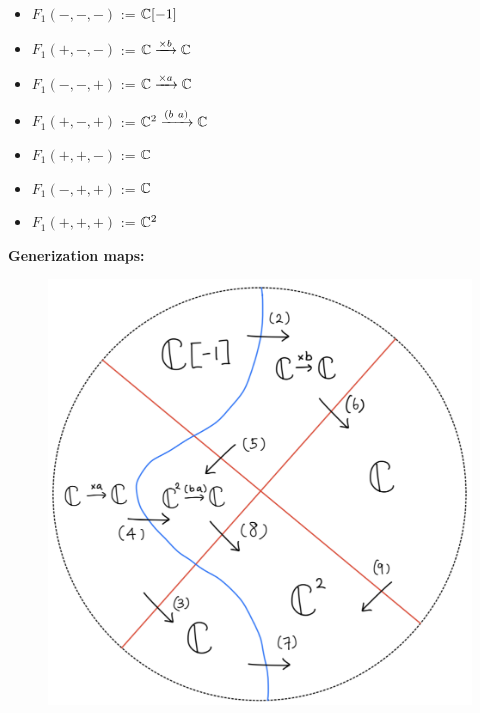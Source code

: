 \begin{itemize}
\item $F_1(-,-,-)$ := $\mathbb{C}[-1]$
\item $F_1(+,-,-)$ := $\mathbb{C} \xrightarrow{\times b} \mathbb{C} $
\item $F_1(-,-,+)$ := $\mathbb{C} \xrightarrow{\times a} \mathbb{C} $
\item $F_1(+,-,+)$ := $\mathbb{C}^2 \xrightarrow{(b ~ a)} \mathbb{C} $
\item $F_1(+,+,-)$ := $\mathbb{C}$
\item $F_1(-,+,+)$ := $\mathbb{C}$
\item $F_1(+,+,+)$ := $\mathbb{C}^2$
\end{itemize}
\textbf{Generization maps:}
\begin{figure}[H]
    \centering
    \includegraphics[scale = 0.95]{diagrams/lemma4/33.png}
    \caption{}
    \label{fig:your-label}
\end{figure}
